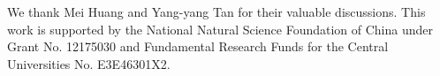 \documentclass[%
reprint,
superscriptaddress,
preprintnumbers,
amsmath,amssymb,
aps,
prd,
]{revtex4-2}
\def\Fig#1{\Cref{#1}}
\newcommand{\colwj}[1]{\textcolor{red}{#1}}
\begin{document}
 

\begin{acknowledgments}
%
We thank Mei Huang and Yang-yang Tan for their valuable discussions. This work is supported by the National Natural Science Foundation of China under Grant No. 12175030 and Fundamental Research Funds for the Central Universities No. E3E46301X2. 
%
\end{acknowledgments}



%
%



	
	
\end{document}
